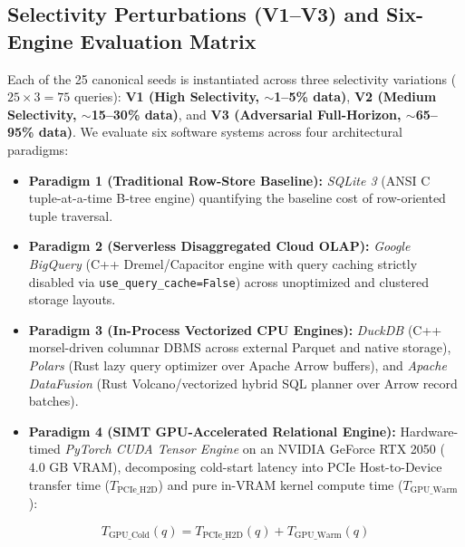 \documentclass[10pt,a4paper]{article}
\begin{document}
\subsection{Selectivity Perturbations (V1--V3) and Six-Engine Evaluation Matrix}
Each of the 25 canonical seeds is instantiated across three selectivity variations ($25 \times 3 = 75$ queries): \textbf{V1 (High Selectivity, $\sim$1--5\% data)}, \textbf{V2 (Medium Selectivity, $\sim$15--30\% data)}, and \textbf{V3 (Adversarial Full-Horizon, $\sim$65--95\% data)}. We evaluate six software systems across four architectural paradigms:
\begin{itemize}[leftmargin=1.5em,itemsep=2pt]
    \item \textbf{Paradigm 1 (Traditional Row-Store Baseline):} \emph{SQLite 3} (ANSI C tuple-at-a-time B-tree engine) quantifying the baseline cost of row-oriented tuple traversal.
    \item \textbf{Paradigm 2 (Serverless Disaggregated Cloud OLAP):} \emph{Google BigQuery} (C++ Dremel/Capacitor engine with query caching strictly disabled via \texttt{use\_query\_cache=False}) across unoptimized and clustered storage layouts.
    \item \textbf{Paradigm 3 (In-Process Vectorized CPU Engines):} \emph{DuckDB} (C++ morsel-driven columnar DBMS across external Parquet and native storage), \emph{Polars} (Rust lazy query optimizer over Apache Arrow buffers), and \emph{Apache DataFusion} (Rust Volcano/vectorized hybrid SQL planner over Arrow record batches).
    \item \textbf{Paradigm 4 (SIMT GPU-Accelerated Relational Engine):} Hardware-timed \emph{PyTorch CUDA Tensor Engine} on an NVIDIA GeForce RTX 2050 ($4.0\text{ GB}$ VRAM), decomposing cold-start latency into PCIe Host-to-Device transfer time ($T_{\text{PCIe\_H2D}}$) and pure in-VRAM kernel compute time ($T_{\text{GPU\_Warm}}$):
\end{itemize}
\begin{equation}
    T_{\text{GPU\_Cold}}(q) = T_{\text{PCIe\_H2D}}(q) + T_{\text{GPU\_Warm}}(q)
\end{equation}
\end{document}
